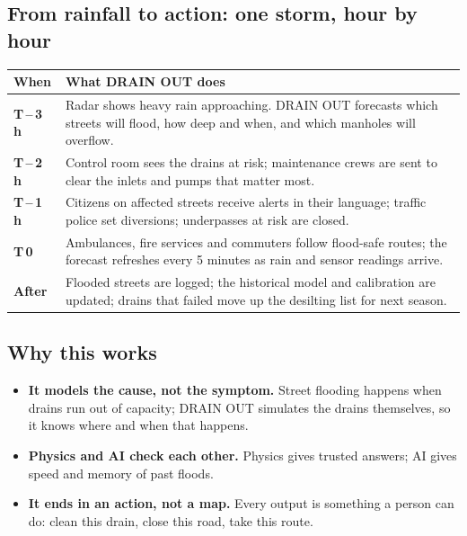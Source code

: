 \documentclass[11pt,a4paper]{article}
\begin{document}
\subsection{From rainfall to action: one storm, hour by hour}

\begin{center}
\begin{tabular}{@{}p{2.2cm}p{13.4cm}@{}}
\toprule
\textbf{When} & \textbf{What DRAIN OUT does}\\
\midrule
\textbf{T\,--\,3 h} & Radar shows heavy rain approaching. DRAIN OUT forecasts which
  streets will flood, how deep and when, and which manholes will overflow.\\
\textbf{T\,--\,2 h} & Control room sees the drains at risk; maintenance crews are sent
  to clear the inlets and pumps that matter most.\\
\textbf{T\,--\,1 h} & Citizens on affected streets receive alerts in their language;
  traffic police set diversions; underpasses at risk are closed.\\
\textbf{T\,0} & Ambulances, fire services and commuters follow flood-safe routes; the
  forecast refreshes every 5 minutes as rain and sensor readings arrive.\\
\textbf{After} & Flooded streets are logged; the historical model and calibration are
  updated; drains that failed move up the desilting list for next season.\\
\bottomrule
\end{tabular}
\end{center}

\subsection{Why this works}
\begin{itemize}
  \item \textbf{It models the cause, not the symptom.} Street flooding happens when
        drains run out of capacity; DRAIN OUT simulates the drains themselves, so it
        knows where and when that happens.
  \item \textbf{Physics and AI check each other.} Physics gives trusted answers; AI gives
        speed and memory of past floods.
  \item \textbf{It ends in an action, not a map.} Every output is something a person can
        do: clean this drain, close this road, take this route.
\end{itemize}

\end{document}
